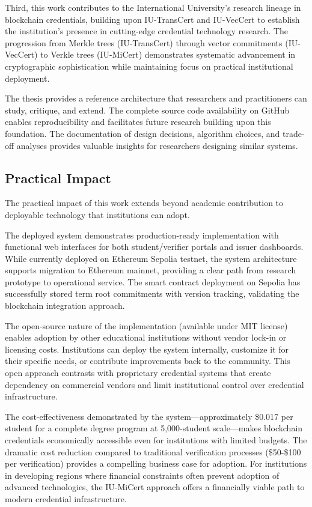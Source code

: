 Third, this work contributes to the International University's research lineage in blockchain credentials, building upon IU-TransCert \cite{le_iutranscert} and IU-VecCert \cite{nguyen2024iuvec} to establish the institution's presence in cutting-edge credential technology research. The progression from Merkle trees (IU-TransCert) through vector commitments (IU-VecCert) to Verkle trees (IU-MiCert) demonstrates systematic advancement in cryptographic sophistication while maintaining focus on practical institutional deployment.

The thesis provides a reference architecture that researchers and practitioners can study, critique, and extend. The complete source code availability on GitHub enables reproducibility and facilitates future research building upon this foundation. The documentation of design decisions, algorithm choices, and trade-off analyses provides valuable insights for researchers designing similar systems.

\subsection{Practical Impact}
\label{subsec:practical-impact}

The practical impact of this work extends beyond academic contribution to deployable technology that institutions can adopt.

The deployed system demonstrates production-ready implementation with functional web interfaces for both student/verifier portals and issuer dashboards. While currently deployed on Ethereum Sepolia testnet, the system architecture supports migration to Ethereum mainnet, providing a clear path from research prototype to operational service. The smart contract deployment on Sepolia has successfully stored term root commitments with version tracking, validating the blockchain integration approach.

The open-source nature of the implementation (available under MIT license) enables adoption by other educational institutions without vendor lock-in or licensing costs. Institutions can deploy the system internally, customize it for their specific needs, or contribute improvements back to the community. This open approach contrasts with proprietary credential systems that create dependency on commercial vendors and limit institutional control over credential infrastructure.

The cost-effectiveness demonstrated by the system—approximately \$0.017 per student for a complete degree program at 5,000-student scale—makes blockchain credentials economically accessible even for institutions with limited budgets. The dramatic cost reduction compared to traditional verification processes (\$50-\$100 per verification) provides a compelling business case for adoption. For institutions in developing regions where financial constraints often prevent adoption of advanced technologies, the IU-MiCert approach offers a financially viable path to modern credential infrastructure.

